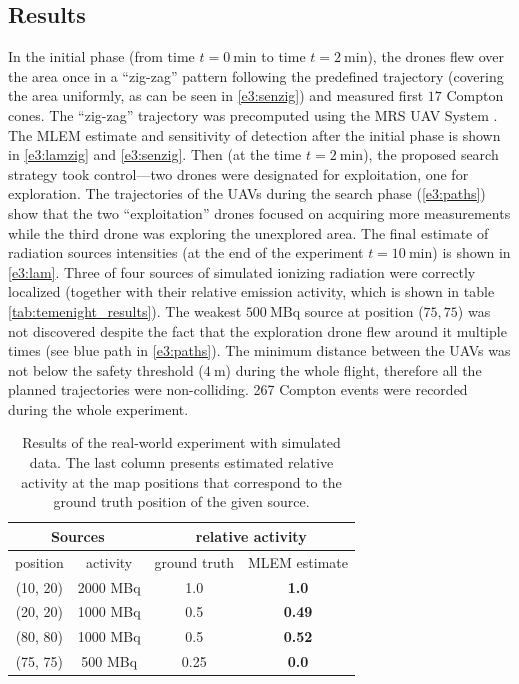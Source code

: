 \subsection{Results}
In the initial phase (from time $t = \SI{0}{\minute}$ to time $t = \SI{2}{\minute}$), the drones flew over the area once in a ``zig-zag'' pattern following the predefined trajectory (covering the area uniformly, as can be seen in \autoref{e3:senzig}) and measured first $17$ Compton cones.
The ``zig-zag'' trajectory was precomputed using the MRS UAV System \cite{mrs_system}.
The \ac{MLEM} estimate and sensitivity of detection after the initial phase is shown in \autoref{e3:lamzig} and \autoref{e3:senzig}.
Then (at the time $t = \SI{2}{\minute}$), the proposed search strategy took control---two drones were designated for exploitation, one for exploration.
The trajectories of the \ac{UAV}s during the search phase (\autoref{e3:paths}) show that the two ``exploitation'' drones focused on acquiring more measurements while the third drone was exploring the unexplored area.
The final estimate of radiation sources intensities (at the end of the experiment $t = \SI{10}{\minute}$) is shown in \autoref{e3:lam}.
Three of four sources of simulated ionizing radiation were correctly localized (together with their relative emission activity, which is shown in table \autoref{tab:temenight_results}).
The weakest $\SI{500}{\mega\becquerel}$ source at position ($75, 75$) was not discovered despite the fact that the exploration drone flew around it multiple times (see blue path in \autoref{e3:paths}).
The minimum distance between the \ac{UAV}s was not below the safety threshold ($\SI{4}{\meter}$) during the whole flight, therefore all the planned trajectories were non-colliding.
267 Compton events were recorded during the whole experiment.
\begin{table}[htb]
\begin{center}
  \begin{tabular}{ |c|c|c|c| } 
 \hline
    \multicolumn{2}{|c}{Sources} &  \multicolumn{2}{|c|}{ relative activity } \\
 \hline
    position & activity & ground truth & MLEM estimate\\ 
 \hline
    (10, 20) & 2000 MBq & 1.0  & \textbf{1.0} \\ 
    (20, 20) & 1000 MBq &  0.5 & \textbf{0.49} \\ 
    (80, 80) & 1000 MBq &  0.5 & \textbf{0.52} \\ 
    (75, 75) & 500 MBq &  0.25 & \textbf{0.0} \\ 
 \hline
\end{tabular}
  \caption{Results of the real-world experiment with simulated data. The last column presents estimated relative activity at the map positions that correspond to the ground truth position of the given source.}
  \label{tab:temenight_results}
\end{center}
\end{table}

